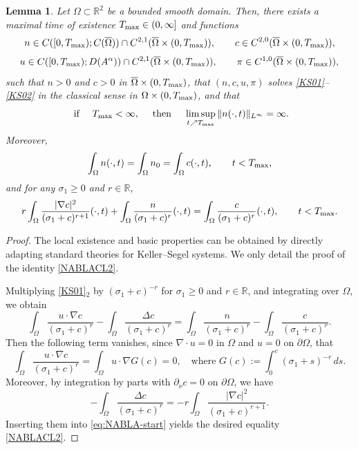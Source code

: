 \documentclass{amsart}
\newtheorem{lemma}[defn]{Lemma}
\numberwithin{equation}{section}
\newcommand{\R}{{ \mathbb{R}  }}
\begin{document}
\begin{lemma}\label{LWLEM} 
Let $\Omega \subset \R^{2}$ be a bounded smooth domain. Then, there exists a maximal time of existence $T_{\rm max}\in(0,\infty]$ and functions
\[
n\in C([0,T_{\rm max});C(\overline{\Omega}))\cap C^{2,1}(\overline{\Omega}\times(0,T_{\rm max})),
\qquad
c\in  C^{2,0}(\overline{\Omega}\times(0,T_{\rm max})),
\]
\[
u\in  C([0,T_{\rm max});D(A^{\alpha})) \cap C^{2,1}(\overline{\Omega}\times(0,T_{\rm max})),\qquad \pi  \in C^{1,0}(\overline{\Omega}\times(0,T_{\rm max})),
\]
 such that $n>0$ and $c>0$ in $\overline{\Omega}\times(0,T_{\rm max})$, that $(n,c,u,\pi)$  solves  \eqref{KS01}--\eqref{KS02} in the classical sense in $\Omega\times(0,T_{\rm max})$, and that
 \[
 \mbox{ if } \quad T_{\rm max}<\infty, \quad \mbox{ then }\quad  \limsup_{t\nearrow T_{\rm max}}\|n(\cdot,t)\|_{L^{\infty}}=\infty. 
 \]
Moreover, 
\[
\int_{\Omega}n(\cdot,t)=\int_{\Omega}n_{0}=\int_{\Omega}c(\cdot,t),\qquad t<T_{\rm max},
\]
and for any $\sigma_{1}\ge0$ and $r\in\R$,
\begin{equation}\label{NABLACL2}
r\int_{\Omega}\frac{|\nabla c|^{2}}{(\sigma_{1}+c)^{r+1}}(\cdot,t)+\int_{\Omega}\frac{n}{(\sigma_{1}+c)^{r}}(\cdot,t)=\int_{\Omega}\frac{c}{(\sigma_{1}+c)^{r}}(\cdot,t),\qquad t<T_{\rm max}.
\end{equation}
\end{lemma}

\begin{proof}
The local existence and basic properties can be obtained by directly adapting standard theories for Keller--Segel systems. We only detail the proof of the identity \eqref{NABLACL2}.

Multiplying \eqref{KS01}$_{2}$ by $(\sigma_{1}+c)^{-r}$ for  $\sigma_{1}\ge 0$ and $r\in\mathbb{R}$, and integrating over $\Omega$, we obtain 
\begin{equation}\label{eq:NABLA-start}
\int_{\Omega} \frac{u\cdot\nabla c}{(\sigma_{1}+c)^{r}}
-\int_{\Omega} \frac{\Delta c}{(\sigma_{1}+c)^{r}}
= \int_{\Omega}\frac{n}{(\sigma_{1}+c)^{r}}-\int_{\Omega}\frac{c}{(\sigma_{1}+c)^{r}}.
\end{equation}
Then the following term vanishes, since $\nabla \cdot u =0$ in $\Omega$ and $u=0$ on $\partial \Omega$, that
\[
\int_{\Omega} \frac{u\cdot\nabla c}{(\sigma_{1}+c)^{r}} = \int_{\Omega} u \cdot \nabla G(c) =0, \quad \mbox{where } G(c):= \int_{0}^{c} (\sigma_1 + s)^{-r} \,ds.
\]
Moreover, by integration by parts with $\partial_{\nu} c =0$ on $\partial \Omega$, we have 
\[
-\int_{\Omega} \frac{\Delta c}{(\sigma_{1}+c)^{r}} = -r\int_{\Omega} \frac{|\nabla c|^2}{(\sigma_1 + c)^{r+1}}. 
\] 
Inserting them into \eqref{eq:NABLA-start} yields the desired equality \eqref{NABLACL2}. 
\end{proof}
\end{document}
